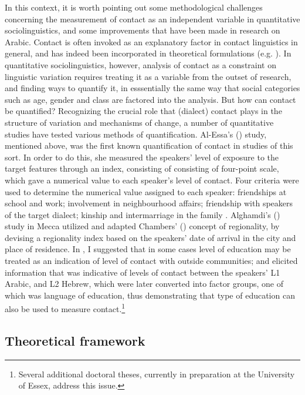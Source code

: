 \documentclass[output=paper]{langsci/langscibook}
\begin{document}
In this context, it is worth pointing out some methodological challenges concerning the measurement of contact as an independent variable in quantitative sociolinguistics, and some improvements that have been made in research on Arabic. Contact is often invoked as an explanatory factor in contact linguistics in general, and has indeed been incorporated in theoretical formulations (e.g. \citealt{ThomasonKaufman1988}). In quantitative sociolinguistics, however, analysis of contact as a constraint on linguistic variation requires treating it as a variable from the outset of research, and finding ways to quantify it, in esssentially the same way that social categories such as age, gender and class are factored into the analysis. But how can contact be quantified? Recognizing the crucial role that (dialect) contact plays in the structure of variation and mechanisms of change, a number of quantitative studies have tested various methods of quantification. Al-Essa's (\citeyear{Al-Essa2009}) study, mentioned above, was the first known quantification of contact in studies of this sort. In order to do this, she measured the speakers’ level of exposure to the target features through an index, consisting of consisting of four-point scale, which gave a numerical value to each speaker’s level of contact. Four criteria were used to determine the numerical value assigned to each speaker: friendships at school and work; involvement in neighbourhood affairs; friendship with speakers of the target dialect; kinship and intermarriage in the family \citep[208]{Al-Essa2009}. Alghamdi's (\citeyear{Alghamdi2014}) study in Mecca utilized and adapted Chambers' (\citeyear{Chambers2000}) concept of regionality, by devising a regionality index based on the speakers’ date of arrival in the city and place of residence. In \citet{Al-Wer2002}, I suggested that in some cases level of education may be treated as an indication of level of contact with outside communities; and \citet{Horesh2014} elicited information that was indicative of levels of contact between the speakers’ L1 Arabic, and L2 Hebrew, which were later converted into factor groups, one of which was language of education, thus demonstrating that type of education can also be used to measure contact.\footnote{Several additional doctoral theses, currently in preparation at the University of Essex, address this issue.}

\subsection{Theoretical framework}
\end{document}
